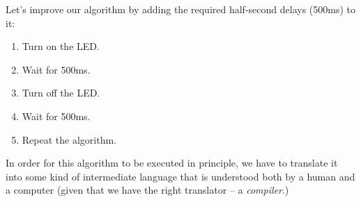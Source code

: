 \documentclass[../sparc.tex]{subfiles}
\begin{document}
Let's improve our algorithm by adding the required half-second delays (500ms) to
it:

\begin{enumerate}
\item Turn on the LED.
\item Wait for 500ms.
\item Turn off the LED.
\item Wait for 500ms.
\item Repeat the algorithm.
\end{enumerate}

In order for this algorithm to be executed in principle, we have to translate it
into some kind of intermediate language that is understood both by a human and a
computer (given that we have the right translator -- a \emph{compiler}.)
\end{document}
